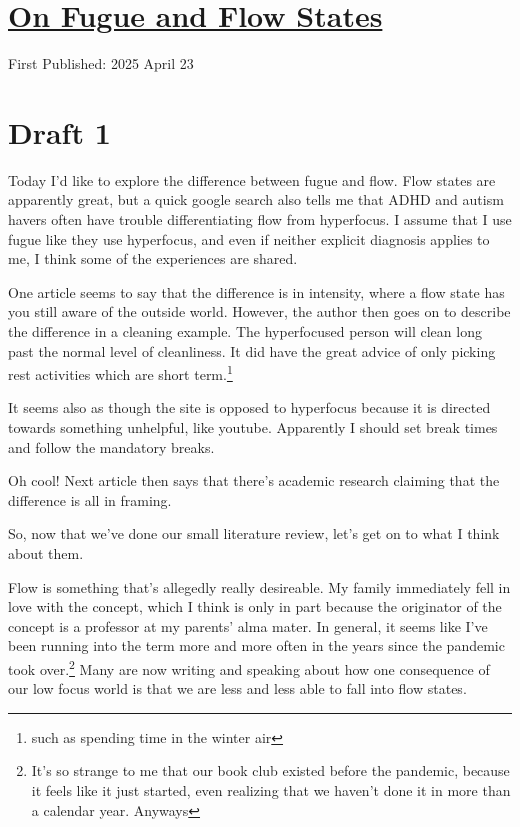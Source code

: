 \documentclass[12pt]{article}
\renewcommand{\,}{\textsuperscript{,}}
\begin{document}
  
\doublespacing  
\section{\href{fugues-and-flow.html}{On Fugue and Flow States}}  
First Published: 2025 April 23

\section{Draft 1}

Today I'd like to explore the difference between fugue and flow.  
Flow states are apparently great, but a quick google search also tells me that ADHD and autism havers often have trouble differentiating flow from hyperfocus.  
I assume that I use fugue like they use hyperfocus, and even if neither explicit diagnosis applies to me, I think some of the experiences are shared.

One article seems to say that the difference is in intensity, where a flow state has you still aware of the outside world.  
However, the author then goes on to describe the difference in a cleaning example.  
The hyperfocused person will clean long past the normal level of cleanliness.  
It did have the great advice of only picking rest activities which are short term.\footnote{such as spending time in the winter air}

It seems also as though the site is opposed to hyperfocus because it is directed towards something unhelpful, like youtube.  
Apparently I should set break times and follow the mandatory breaks.

Oh cool! Next article then says that there's academic research claiming that the difference is all in framing.

So, now that we've done our small literature review, let's get on to what I think about them.

Flow is something that's allegedly really desireable.  
My family immediately fell in love with the concept, which I think is only in part because the originator of the concept is a professor at my parents' alma mater.  
In general, it seems like I've been running into the term more and more often in the years since the pandemic took over.\footnote{It's so strange to me that our book club existed before the pandemic, because it feels like it just started, even realizing that we haven't done it in more than a calendar year. Anyways}  
Many are now writing and speaking about how one consequence of our low focus world is that we are less and less able to fall into flow states.
\end{document}
